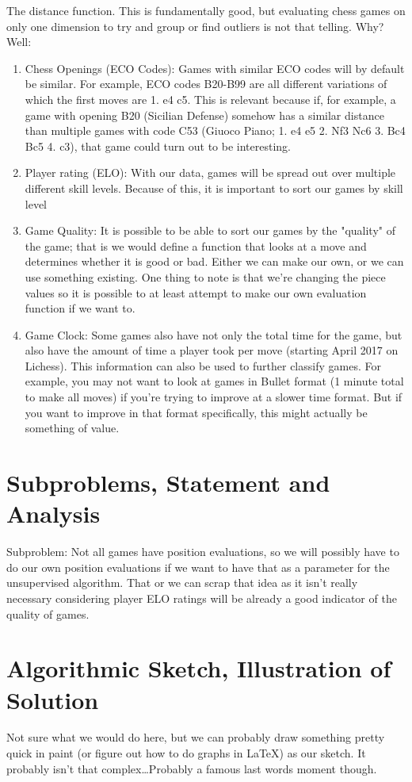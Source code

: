 \documentclass[12pt]{article}
\begin{document}
        The distance function. This is fundamentally good, but evaluating chess games on only one dimension to try and group or find outliers is not that telling. Why? Well:

        \begin{enumerate}
            \item Chess Openings (ECO Codes): Games with similar ECO codes will by default be similar. For example, ECO codes B20-B99 are all different variations of which the first moves are 1. e4 c5. This is relevant because if, for example, a game with opening B20 (Sicilian Defense) somehow has a similar distance than multiple games with code C53 (Giuoco Piano; 1. e4 e5 2. Nf3 Nc6 3. Bc4 Bc5 4. c3), that game could turn out to be interesting. 
            \item Player rating (ELO): With our data, games will be spread out over multiple different skill levels. Because of this, it is important to sort our games by skill level 
            \item Game Quality: It is possible to be able to sort our games by the "quality" of the game; that is we would define a function that looks at a move and determines whether it is good or bad. Either we can make our own, or we can use something existing. One thing to note is that we're changing the piece values so it is possible to at least attempt to make our own evaluation function if we want to.
            \item Game Clock: Some games also have not only the total time for the game, but also have the amount of time a player took per move (starting April 2017 on Lichess). This information can also be used to further classify games. For example, you may not want to look at games in Bullet format (1 minute total to make all moves) if you're trying to improve at a slower time format. But if you want to improve in that format specifically, this might actually be something of value.
        \end{enumerate}

    \section{Subproblems, Statement and Analysis}

    Subproblem: Not all games have position evaluations, so we will possibly have to do our own position evaluations if we want to have that as a parameter for the unsupervised algorithm. That or we can scrap that idea as it isn't really necessary considering player ELO ratings will be already a good indicator of the quality of games. 

    \section{Algorithmic Sketch, Illustration of Solution}

    Not sure what we would do here, but we can probably draw something pretty quick in paint (or figure out how to do graphs in \LaTeX) as our sketch. It probably isn't that complex\dots Probably a famous last words moment though.

    \printbibliography
    
\end{document}
